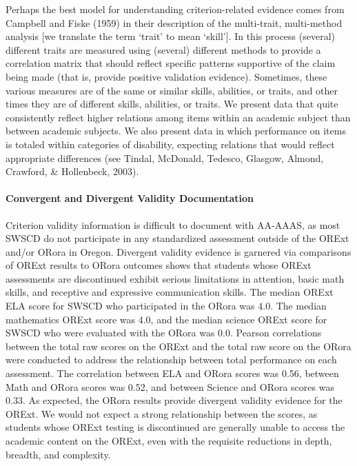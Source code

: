 \documentclass[]{article}
\let\oldparagraph\paragraph
\renewcommand{\paragraph}[1]{\oldparagraph{#1}\mbox{}}
\begin{document}
Perhaps the best model for understanding criterion-related evidence
comes from Campbell and Fiske (1959) in their description of the
multi-trait, multi-method analysis {[}we translate the term `trait' to
mean `skill'{]}. In this process (several) different traits are measured
using (several) different methods to provide a correlation matrix that
should reflect specific patterns supportive of the claim being made
(that is, provide positive validation evidence). Sometimes, these
various measures are of the same or similar skills, abilities, or
traits, and other times they are of different skills, abilities, or
traits. We present data that quite consistently reflect higher relations
among items within an academic subject than between academic subjects.
We also present data in which performance on items is totaled within
categories of disability, expecting relations that would reflect
appropriate differences (see Tindal, McDonald, Tedesco, Glasgow, Almond,
Crawford, \& Hollenbeck, 2003).

\paragraph{Convergent and Divergent Validity
Documentation}\label{convergent-and-divergent-validity-documentation}

Criterion validity information is difficult to document with AA-AAAS, as
most SWSCD do not participate in any standardized assessment outside of
the ORExt and/or ORora in Oregon. Divergent validity evidence is
garnered via comparisons of ORExt results to ORora outcomes shows that
students whose ORExt assessments are discontinued exhibit serious
limitations in attention, basic math skills, and receptive and
expressive communication skills. The median ORExt ELA score for SWSCD
who participated in the ORora was 4.0. The median mathematics ORExt
score was 4.0, and the median science ORExt score for SWSCD who were
evaluated with the ORora was 0.0. Pearson correlations between the total
raw scores on the ORExt and the total raw score on the ORora were
conducted to address the relationship between total performance on each
assessment. The correlation between ELA and ORora scores was 0.56,
between Math and ORora scores was 0.52, and between Science and ORora
scores was 0.33. As expected, the ORora results provide divergent
validity evidence for the ORExt. We would not expect a strong
relationship between the scores, as students whose ORExt testing is
discontinued are generally unable to access the academic content on the
ORExt, even with the requisite reductions in depth, breadth, and
complexity.
\end{document}
